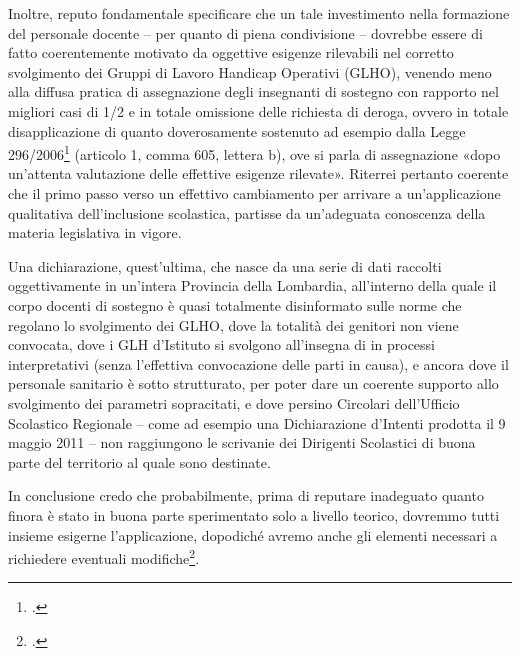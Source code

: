 Inoltre, reputo fondamentale specificare che un tale investimento nella formazione del personale docente – per quanto di piena condivisione – dovrebbe essere di fatto coerentemente motivato da oggettive esigenze rilevabili nel corretto svolgimento dei Gruppi di Lavoro Handicap Operativi (GLHO), venendo meno alla diffusa pratica di assegnazione degli insegnanti di sostegno con rapporto nel migliori casi di 1/2 e in totale omissione delle richiesta di deroga, ovvero in totale disapplicazione di quanto doverosamente sostenuto ad esempio dalla Legge 296/2006\footcite{Legge_296_2006} (articolo 1, comma 605, lettera b), ove si parla di assegnazione «dopo un'attenta valutazione delle effettive esigenze rilevate».
Riterrei pertanto coerente che il primo passo verso un effettivo cambiamento per arrivare a un'applicazione qualitativa dell'inclusione scolastica, partisse da un'adeguata conoscenza della materia legislativa in vigore.

Una dichiarazione, quest'ultima, che nasce da una serie di dati raccolti oggettivamente in un'intera Provincia della Lombardia, all'interno della quale il corpo docenti di sostegno è quasi totalmente disinformato sulle norme che regolano lo svolgimento dei GLHO, dove la totalità dei genitori non viene convocata, dove i GLH d'Istituto si svolgono all'insegna di in processi interpretativi (senza l'effettiva convocazione delle parti in causa), e ancora dove il personale sanitario è sotto strutturato, per poter dare un coerente supporto allo svolgimento dei parametri sopracitati, e dove persino Circolari dell'Ufficio Scolastico Regionale – come ad esempio una Dichiarazione d'Intenti prodotta il 9 maggio 2011 – non raggiungono le scrivanie dei Dirigenti Scolastici di buona parte del territorio al quale sono destinate.

In conclusione credo che probabilmente, prima di reputare inadeguato quanto finora è stato in buona parte sperimentato solo a livello teorico, dovremmo tutti insieme esigerne l'applicazione, dopodiché avremo anche gli elementi necessari a richiedere eventuali modifiche\footcite{Brogi2013}.